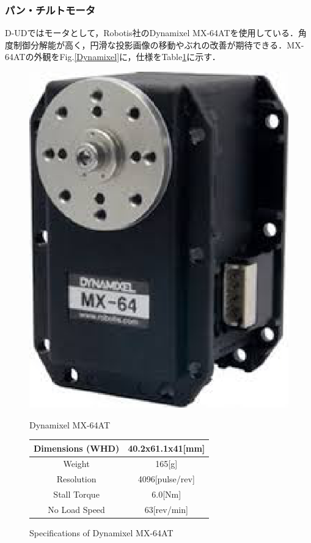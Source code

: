 \documentclass[12pt]{sonota/aislab}
\begin{document}
\subsubsection{パン・チルトモータ}
D-UDではモータとして，Robotis社のDynamixel MX-64ATを使用している．角度制御分解能が高く，円滑な投影画像の移動やぶれの改善が期待できる．MX-64ATの外観をFig.\ref{Dynamixel}に，仕様をTable\ref{table:Dynamixel}に示す．

\begin{figure}
\begin{minipage}{0.4\textwidth}
\begin{center}
\includegraphics[scale=0.4]{figs/MX_64AT.eps}
\caption{Dynamixel MX-64AT}
\label{Dynamixel}
\end{center}
\end{minipage}
\begin{minipage}{0.5\textwidth}
\begin{center}
\makeatletter
\def\@captype{table}
\makeatother
\caption{Specifications of Dynamixel MX-64AT}
	\begin{tabular}[tbp]{|c|c|}
		\hline 
		Dimensions (WHD) & 40.2x61.1x41[mm] \\\hline
		Weight & 165[g] \\\hline
		Resolution & 4096[pulse/rev] \\\hline
		Stall Torque & 6.0[Nm] \\\hline
		No Load Speed & 63[rev/min] \\\hline
	\end{tabular}
\label{table:Dynamixel}
\end{center}
\end{minipage}
\end{figure}
\end{document}
